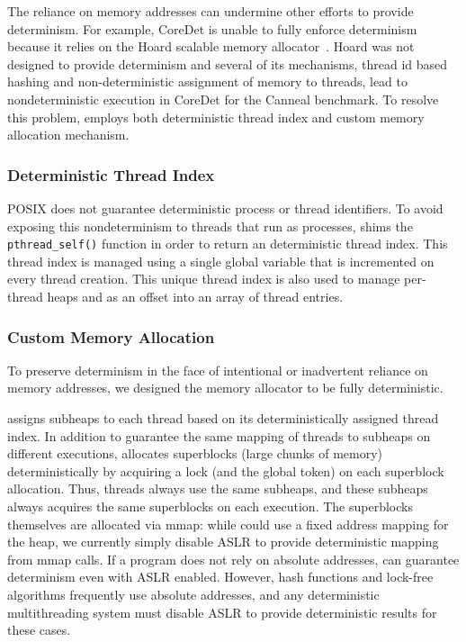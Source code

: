 The reliance on memory addresses can undermine other efforts to provide determinism. For example, CoreDet is unable to fully enforce determinism because it relies on the Hoard scalable memory allocator~\cite{Bergan:2010:CCR:1736020.1736029}. Hoard was not designed to provide determinism and several of its mechanisms, thread id based hashing and non-deterministic assignment of memory to threads, lead to nondeterministic execution in CoreDet for the Canneal benchmark. To resolve this problem, \dthreads{} employs both deterministic thread index and custom memory allocation mechanism. 

\subsubsection{Deterministic Thread Index}
\label{sec:threadindex}

POSIX does not guarantee deterministic process or thread identifiers. To avoid exposing this nondeterminism to threads that run as processes, \dthreads{} shims the \texttt{pthread\_self()} function in order to return an deterministic thread index.  This thread index is managed using a single global variable that is incremented on every thread creation.  This unique thread index is also used to manage per-thread heaps and as an offset into an array of thread entries.

\subsubsection{Custom Memory Allocation}

To preserve determinism in the face of intentional or inadvertent reliance on memory addresses, we designed the \dthreads{} memory allocator to be fully deterministic. 

\dthreads{} assigns subheaps to each thread based on its deterministically assigned thread index. In addition to guarantee the same mapping of threads to subheaps on different executions, \dthreads{} allocates superblocks (large chunks of memory) deterministically by acquiring a lock (and the global token) on each superblock allocation. Thus, threads always use the same subheaps, and these subheaps always acquires the same superblocks on each execution. The superblocks themselves are allocated via mmap: while \dthreads{} could use a fixed address mapping for the heap, we currently simply disable ASLR to provide deterministic mapping from mmap calls. If a program does not rely on absolute addresses, \dthreads{} can guarantee determinism even with ASLR enabled. However, hash functions and lock-free algorithms frequently use absolute addresses, and any deterministic multithreading system must disable ASLR to provide deterministic results for these cases.


